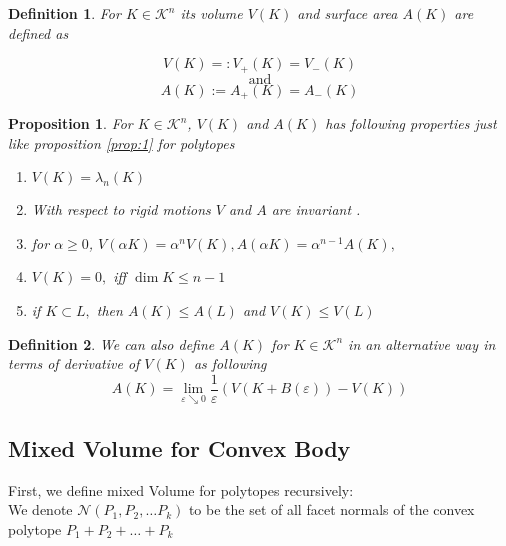 \documentclass[oneside]{book}
\newtheorem{mydef}{Definition}
\newtheorem{prop}{Proposition}
\begin{document}
 \begin{mydef}
 For $K \in \mathcal{K}^n$ its volume $V(K) $ and surface area $A(K)$ are defined as 


\[
  V(K) =: V_{+}(K)=V_{-}(K)
\]
$$\text{and} $$
\[
 A(K) :=  A_{+}(K) = A_{-}(K) 
\]
 
\end{mydef}
 \begin{prop}
 

For $ K \in \mathcal{K}^n $,  $V(K) $ and $A(K) $ has following properties just like proposition \ref{prop:1} for polytopes
\begin{enumerate}
    \item  $V(K)=\lambda_{n}(K)$
\item With respect to rigid motions $V$ and $A$ are invariant .
\item  for $\alpha \geq 0$, $V(\alpha K)=\alpha^{n} V(K), A(\alpha K)=\alpha^{n-1} A(K),$ 
\item $V(K)=0,$ iff $\operatorname{dim} K \leq n-1$
\item if $K \subset L,$ then  $A(K) \leq A(L)$ and $V(K) \leq V(L)$

\end{enumerate}

 \end{prop}
\begin{mydef}
We can also define $A(K)$ for $K \in \mathcal{K}^n$ in an alternative way in terms of derivative of $V(K)$ as following \\
\begin{equation}
A(K)=\lim _{\varepsilon \searrow 0} \frac{1}{\varepsilon}(V(K+B(\varepsilon))-V(K))
\end{equation}



\end{mydef}

\newpage


\subsection{Mixed Volume for Convex Body}
First, we define mixed Volume for polytopes recursively:  \\
We denote  $ \mathcal{N}(P_{1},P_{2},\ldots P_{k})$ to be the set of all facet normals of the convex polytope $P_{1}+P_{2}+ \ldots + P_{k}$
\end{document}

